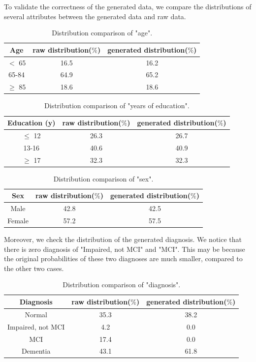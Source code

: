 \documentclass{article}
\begin{document}
To validate the correctness of the generated data, we compare the distributions of several attributes between the generated data and raw data.

\begin{table}[!hbt]
  \centering
  \caption{Distribution comparison of "age".}
  \begin{tabular}{c|c|c}
  \toprule
  Age & raw distribution($\%$) & generated distribution($\%$) \\
  \midrule
  $<$ 65 & 16.5 & 16.2 \\
  65-84 & 64.9 & 65.2 \\
  $\geq$ 85 & 18.6 & 18.6 \\
  \bottomrule
  \end{tabular}
\end{table}

\begin{table}[!hbt]
  \centering
  \caption{Distribution comparison of "years of education".}
  \begin{tabular}{c|c|c}
  \toprule
  Education (y) & raw distribution($\%$) & generated distribution($\%$) \\
  \midrule
  $\leq$ 12 & 26.3 & 26.7 \\
  13-16 & 40.6 & 40.9 \\
  $\geq$ 17 & 32.3 & 32.3 \\
  \bottomrule
  \end{tabular}
\end{table}

\begin{table}[!hbt]
  \centering
  \caption{Distribution comparison of "sex".}
  \begin{tabular}{c|c|c}
  \toprule
  Sex & raw distribution($\%$) & generated distribution($\%$) \\
  \midrule
  Male & 42.8 & 42.5 \\
  Female & 57.2 & 57.5 \\
  \bottomrule
  \end{tabular}
\end{table}

\newpage
Moreover, we check the distribution of the generated diagnosis. We notice that there is zero diagnosis of "Impaired, not MCI" and "MCI". This may be because the original probabilities of these two diagnoses are much smaller, compared to the other two cases.

\begin{table}[!hbt]
  \centering
  \caption{Distribution comparison of "diagnosis".}
  \begin{tabular}{c|c|c}
  \toprule
  Diagnosis & raw distribution($\%$) & generated distribution($\%$) \\
  \midrule
  Normal & 35.3 & 38.2 \\
  Impaired, not MCI & 4.2 & 0.0 \\
  MCI & 17.4 & 0.0 \\
  Dementia & 43.1 & 61.8 \\
  \bottomrule
  \end{tabular}
\end{table}
\end{document}
